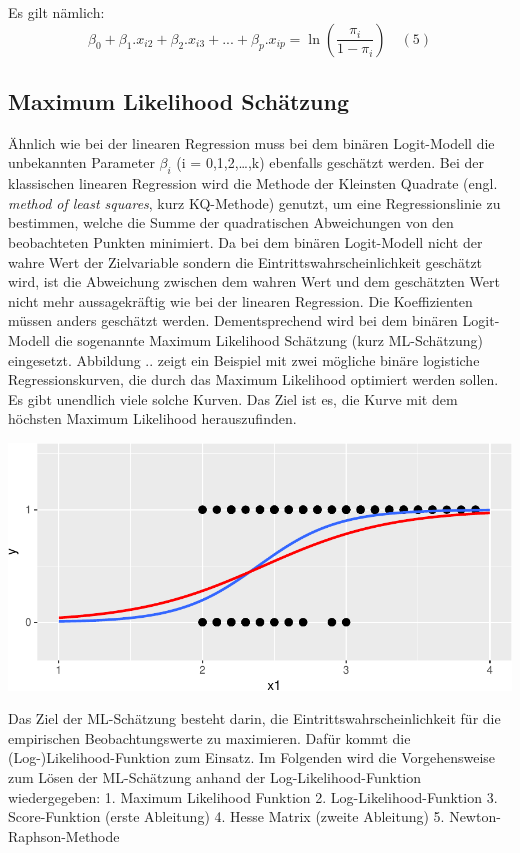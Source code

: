 \documentclass[12pt,]{article}
\begin{document}
Es gilt nämlich: \[
\beta_0 + \beta_1.x_{i2} + \beta_2.x_{i3} + ... + \beta_p.x_{ip} = \ln(\frac{\pi_i}{1-\pi_i}) \quad (5)
\]

\subsection{Maximum Likelihood
Schätzung}\label{maximum-likelihood-schatzung}

Ähnlich wie bei der linearen Regression muss bei dem binären
Logit-Modell die unbekannten Parameter \(\beta_i\) (i =
0,1,2,\ldots{},k) ebenfalls geschätzt werden. Bei der klassischen
linearen Regression wird die Methode der Kleinsten Quadrate (engl.
\emph{method of least squares}, kurz KQ-Methode) genutzt, um eine
Regressionslinie zu bestimmen, welche die Summe der quadratischen
Abweichungen von den beobachteten Punkten minimiert. Da bei dem binären
Logit-Modell nicht der wahre Wert der Zielvariable sondern die
Eintrittswahrscheinlichkeit geschätzt wird, ist die Abweichung zwischen
dem wahren Wert und dem geschätzten Wert nicht mehr aussagekräftig wie
bei der linearen Regression. Die Koeffizienten müssen anders geschätzt
werden. Dementsprechend wird bei dem binären Logit-Modell die sogenannte
Maximum Likelihood Schätzung (kurz ML-Schätzung) eingesetzt. Abbildung
.. zeigt ein Beispiel mit zwei mögliche binäre logistiche
Regressionskurven, die durch das Maximum Likelihood optimiert werden
sollen. Es gibt unendlich viele solche Kurven. Das Ziel ist es, die
Kurve mit dem höchsten Maximum Likelihood herauszufinden.

\includegraphics{logisticRegression_files/figure-latex/unnamed-chunk-2-1.pdf}

Das Ziel der ML-Schätzung besteht darin, die Eintrittswahrscheinlichkeit
für die empirischen Beobachtungswerte zu maximieren. Dafür kommt die
(Log-)Likelihood-Funktion zum Einsatz. Im Folgenden wird die
Vorgehensweise zum Lösen der ML-Schätzung anhand der
Log-Likelihood-Funktion wiedergegeben: 1. Maximum Likelihood Funktion 2.
Log-Likelihood-Funktion 3. Score-Funktion (erste Ableitung) 4. Hesse
Matrix (zweite Ableitung) 5. Newton-Raphson-Methode
\end{document}
